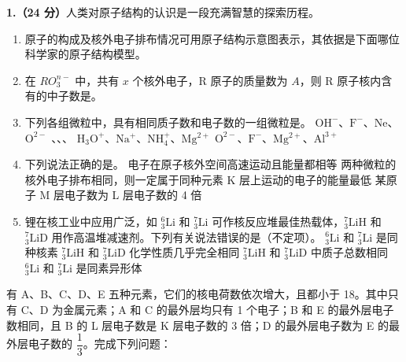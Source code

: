 \documentclass[11pt,a4paper]{article}
\title{\heiti\bfseries\Large \paperhead}
\author{}
\date{}
\newcommand{\workspace}[1][6]{\ansspace[#1]}
\begin{document}
\maketitle
\thispagestyle{fancy}


\noindent\textbf{1.（24 分）}人类对原子结构的认识是一段充满智慧的探索历程。

\begin{enumerate}[label=（\arabic*）]
\item 原子的构成及核外电子排布情况可用原子结构示意图表示，其依据是下面哪位科学家的原子结构模型\blank[2.6em]。

\item 在 $RO_3^{n-}$ 中，共有 $x$ 个核外电子，R 原子的质量数为 $A$，则 R 原子核内含有的中子数是\blank[4em]。
\workspace[3]

\item 下列各组微粒中，具有相同质子数和电子数的一组微粒是\blank[3em]。
\choicepairs
  {$\mathrm{OH^-}$、$\mathrm{F^-}$、$\mathrm{Ne}$、$\mathrm{O^{2-}}$}
  {、、、}
  {$\mathrm{H_3O^+}$、$\mathrm{Na^+}$、$\mathrm{NH_4^+}$、$\mathrm{Mg^{2+}}$}
  {$\mathrm{O^{2-}}$、$\mathrm{F^-}$、$\mathrm{Mg^{2+}}$、$\mathrm{Al^{3+}}$}

\item 下列说法正确的是\blank[3em]。
\choicelines
  {电子在原子核外空间高速运动且能量都相等}
  {两种微粒的核外电子排布相同，则一定属于同种元素}
  {K 层上运动的电子的能量最低}
  {某原子 M 层电子数为 L 层电子数的 4 倍}

\item 锂在核工业中应用广泛，如 ${}_{3}^{6}\mathrm{Li}$ 和 ${}_{3}^{7}\mathrm{Li}$ 可作核反应堆最佳热载体，${}_{3}^{7}\mathrm{LiH}$ 和 ${}_{3}^{7}\mathrm{LiD}$ 用作高温堆减速剂。下列有关说法错误的是\blank[3em]（不定项）。
\choicepairs
  {${}_{3}^{6}\mathrm{Li}$ 和 ${}_{3}^{7}\mathrm{Li}$ 是同种核素}
  {${}_{3}^{7}\mathrm{LiH}$ 和 ${}_{3}^{7}\mathrm{LiD}$ 化学性质几乎完全相同}
  {${}_{3}^{7}\mathrm{LiH}$ 和 ${}_{3}^{7}\mathrm{LiD}$ 中质子总数相同}
  {${}_{3}^{6}\mathrm{Li}$ 和 ${}_{3}^{7}\mathrm{Li}$ 是同素异形体}
\end{enumerate}

有 A、B、C、D、E 五种元素，它们的核电荷数依次增大，且都小于 18。其中只有 C、D 为金属元素；A 和 C 的最外层均只有 1 个电子；B 和 E 的最外层电子数相同，且 B 的 L 层电子数是 K 层电子数的 3 倍；D 的最外层电子数为 E 的最外层电子数的 $\dfrac{1}{3}$。完成下列问题：
\end{document}
